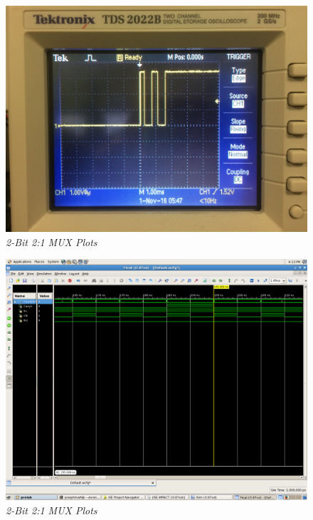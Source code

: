 \documentclass[a4paper,12pt]{article}
\begin{document}
\begin{figure}[h]
  \begin{center}
    \includegraphics[scale=.1]{IMG_8624.JPG}
    \caption{\textit{2-Bit 2:1 MUX Plots}}
  \end{center}
\end{figure}
\newpage
\begin{figure}[h]
  \begin{center}
    \includegraphics[scale=.1]{RollOver.png}
    \caption{\textit{2-Bit 2:1 MUX Plots}}
  \end{center}
\end{figure}
\newpage
\end{document}
